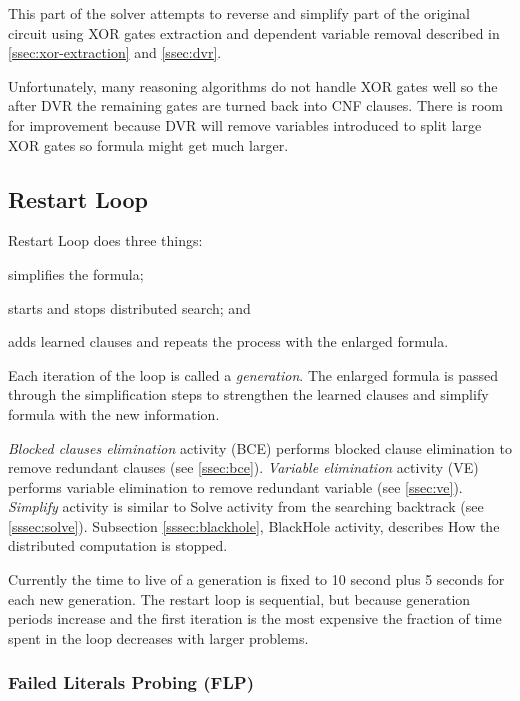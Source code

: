 This part of the solver attempts to reverse and simplify part of the
original circuit using XOR gates extraction and dependent variable
removal described in \ref{ssec:xor-extraction} and \ref{ssec:dvr}.

Unfortunately, many reasoning algorithms do not handle XOR gates
well so the after DVR the remaining gates are turned back into CNF
clauses. There is room for improvement because DVR will remove
variables introduced to split large XOR gates so formula might get
much larger.


\subsection{Restart Loop}


Restart Loop does three things:
\begin{inparaenum}[a)]
  \item simplifies the formula;
  \item starts and stops distributed search; and
  \item adds learned clauses and repeats the process with the enlarged formula.
\end{inparaenum} Each iteration of the loop is called a
\emph{generation}. The enlarged formula is passed through the
simplification steps to strengthen the learned clauses and simplify
formula with the new information.

\emph{Blocked clauses elimination} activity (BCE) performs
blocked clause elimination to remove redundant clauses (see
\ref{ssec:bce}). \emph{Variable elimination} activity (VE) performs
variable elimination to remove redundant variable (see
\ref{ssec:ve}). \emph{Simplify} activity is similar to Solve
activity from the searching backtrack (see \ref{sssec:solve}).
Subsection \ref{sssec:blackhole}, BlackHole activity, describes
How the distributed computation is stopped.

Currently the time to live of a generation is fixed to 10 second
plus 5 seconds for each new generation.  The restart loop is sequential, but because generation
periods increase and the first iteration is the most expensive the
fraction of time spent in the loop decreases with larger problems.


\subsubsection{Failed Literals Probing (FLP)}
\label{sssec:flp}

